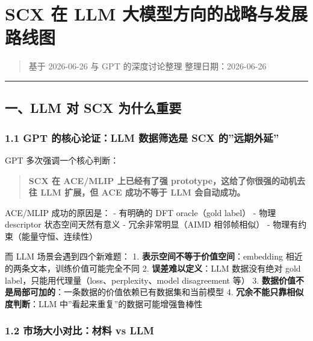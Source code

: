 \documentclass[
  12pt,
]{ctexart}
\author{SCX}
\date{2026}
\begin{document}
\section{SCX 在 LLM
大模型方向的战略与发展路线图}\label{scx-ux5728-llm-ux5927ux6a21ux578bux65b9ux5411ux7684ux6218ux7565ux4e0eux53d1ux5c55ux8defux7ebfux56fe}

\begin{quote}
基于 2026-06-26 与 GPT 的深度讨论整理 整理日期：2026-06-26
\end{quote}

\begin{center}\rule{0.5\linewidth}{0.5pt}\end{center}

\subsection{一、LLM 对 SCX
为什么重要}\label{ux4e00llm-ux5bf9-scx-ux4e3aux4ec0ux4e48ux91cdux8981}

\subsubsection{1.1 GPT 的核心论证：LLM 数据筛选是 SCX
的''远期外延''}\label{gpt-ux7684ux6838ux5fc3ux8bbaux8bc1llm-ux6570ux636eux7b5bux9009ux662f-scx-ux7684ux8fdcux671fux5916ux5ef6}

GPT 多次强调一个核心判断：

\begin{quote}
\textbf{SCX 在 ACE/MLIP 上已经有了强 prototype，这给了你很强的动机去往
LLM 扩展，但 ACE 成功不等于 LLM 会自动成功。}
\end{quote}

ACE/MLIP 成功的原因是： - 有明确的 DFT oracle（gold label） - 物理
descriptor 状态空间天然有意义 - 冗余非常明显（AIMD 相邻帧相似） -
物理有约束（能量守恒、连续性）

而 LLM 场景会遇到四个新难题： 1.
\textbf{表示空间不等于价值空间}：embedding
相近的两条文本，训练价值可能完全不同 2. \textbf{误差难以定义}：LLM
数据没有绝对 gold label，只能用代理量（loss、perplexity、model
disagreement 等） 3.
\textbf{数据价值不是局部可加的}：一条数据的价值依赖已有数据集和当前模型
4. \textbf{冗余不能只靠相似度判断}：LLM
中''看起来重复''的数据可能增强鲁棒性

\subsubsection{1.2 市场大小对比：材料 vs
LLM}\label{ux5e02ux573aux5927ux5c0fux5bf9ux6bd4ux6750ux6599-vs-llm}
\end{document}
